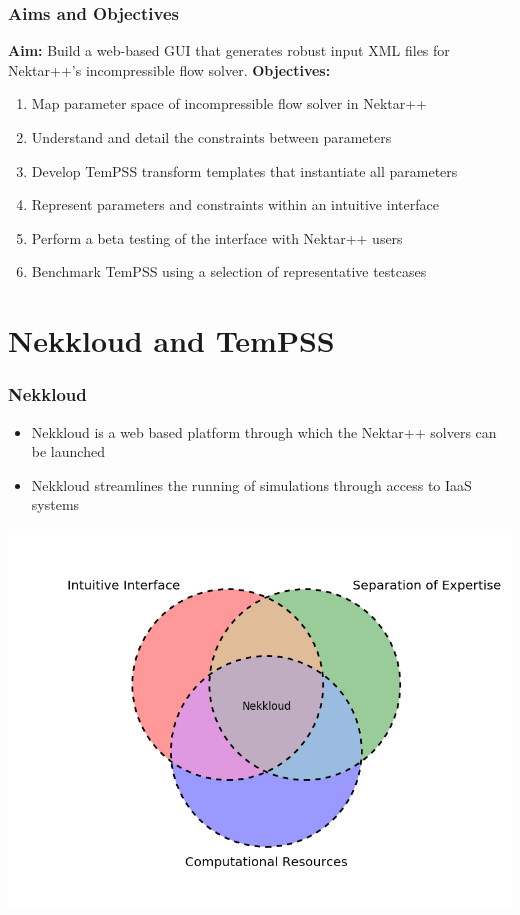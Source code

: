 \documentclass{beamer}
\begin{document}
\begin{frame}\frametitle{Aims and Objectives}
\textbf{Aim:} Build a web-based GUI that generates robust input XML files for Nektar++'s incompressible flow solver.
\newline
\newline
\textbf{Objectives:}
\small
\begin{enumerate}
\item Map parameter space of incompressible flow solver in Nektar++
\item Understand and detail the constraints between parameters
\item Develop TemPSS transform templates that instantiate all parameters
\item Represent parameters and constraints within an intuitive interface
\item Perform a beta testing of the interface with Nektar++ users
\item Benchmark TemPSS using a selection of representative testcases
\end{enumerate}
\end{frame}

\section{Nekkloud and TemPSS} 
\begin{frame}\frametitle{Nekkloud}
\begin{itemize}
\item  Nekkloud is a web based platform through which the Nektar++ solvers can be launched
\item Nekkloud streamlines the running of simulations through access to IaaS systems
\end{itemize}
\centering
\vspace{3pt}
\includegraphics[width=.75\linewidth,  clip=true, trim = 0cm 0cm 0cm 2cm]{venn_diagram}
\end{frame}
\end{document}

